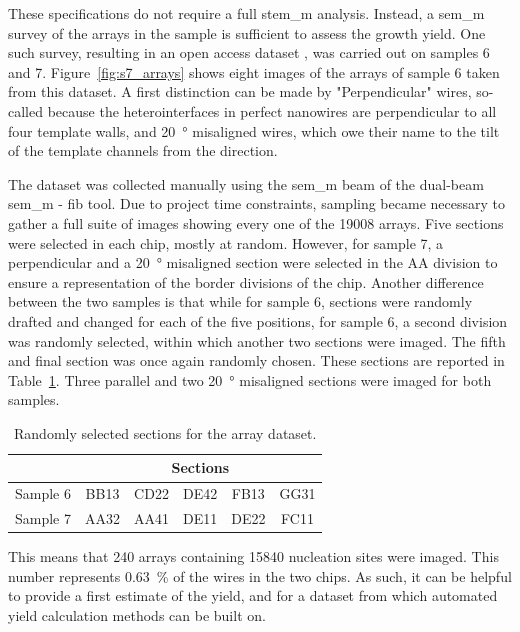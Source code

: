 These specifications do not require a full \acs{stem_m} analysis. Instead, a \acs{sem_m} survey of the arrays in the sample is sufficient to assess the growth yield. One such survey, resulting in an open access dataset \cite{dataset}, was carried out on samples 6 and 7. Figure~\ref{fig:s7_arrays} shows eight images of the arrays of sample 6 taken from this dataset. A first distinction can be made by "Perpendicular" wires, so-called because the heterointerfaces in perfect nanowires are perpendicular to all four template walls, and \qty{20}{\degree} misaligned wires, which owe their name to the tilt of the template channels from the  direction.

The dataset was collected manually using the \acs{sem_m} beam of the dual-beam \acs{sem_m} - \acs{fib} tool. Due to project time constraints, sampling became necessary to gather a full suite of images showing every one of the \num{19008} arrays. Five sections were selected in each chip, mostly at random. However, for sample 7, a perpendicular and a \qty{20}{\degree} misaligned section were selected in the AA division to ensure a representation of the border divisions of the chip. Another difference between the two samples is that while for sample 6, sections were randomly drafted and changed for each of the five positions, for sample 6, a second division was randomly selected, within which another two sections were imaged. The fifth and final section was once again randomly chosen. These sections are reported in Table~\ref{tab:dataset_sections}. Three parallel and two \qty{20}{\degree} misaligned sections were imaged for both samples.

\begin{table}
    \centering
    \caption{Randomly selected sections for the array dataset.}
    \begin{tabular}{c|c c c c c}
         & \multicolumn{5}{c}{Sections} \\ \hline
        Sample 6 & BB13 & CD22 & DE42 & FB13 & GG31 \\
        Sample 7 & AA32 & AA41 & DE11 & DE22 & FC11 \\ \hline \hline
    \end{tabular}
    \label{tab:dataset_sections}
\end{table}

This means that 240 arrays containing 15840 nucleation sites were imaged. This number represents \qty{0.63}{\percent} of the wires in the two chips. As such, it can be helpful to provide a first estimate of the yield, and for a dataset from which automated yield calculation methods can be built on.

